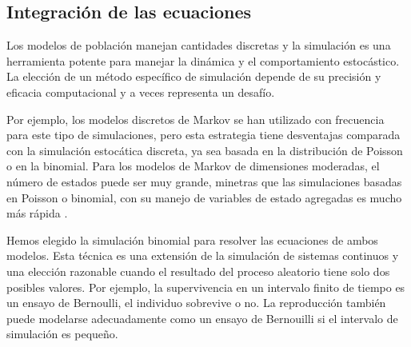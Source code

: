 \subsection{Integración de las ecuaciones}
\label{DINAMINCA_NumSim}

Los modelos de población manejan cantidades discretas y la simulación es una herramienta potente para manejar la dinámica y el comportamiento estocástico. La elección de un método específico de simulación depende de su precisión y eficacia computacional y a veces representa un desafío.

Por ejemplo, los modelos discretos de Markov se han utilizado con frecuencia para este tipo de simulaciones, pero esta estrategia tiene desventajas comparada con la simulación estocática discreta, ya sea basada en la distribución de Poisson o en la binomial. Para los modelos de Markov de dimensiones moderadas, el número de estados puede ser muy grande, minetras que las simulaciones basadas en Poisson o binomial, con su manejo de variables de estado agregadas es mucho más rápida  \cite{gustafsson2007bringing, balcan2009multiscale}.

Hemos elegido la simulación binomial para resolver las ecuaciones de ambos modelos. Esta técnica es una extensión de la simulación de sistemas continuos y una elección razonable cuando el resultado del proceso aleatorio tiene solo dos posibles valores. Por ejemplo, la supervivencia en un intervalo finito de tiempo es un ensayo de Bernoulli, el individuo sobrevive o no. La reproducción también puede modelarse adecuadamente como un ensayo de Bernouilli si el intervalo de simulación es pequeño. 

